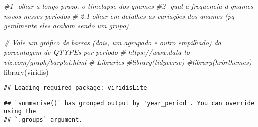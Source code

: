 \documentclass[
]{article}
\newenvironment{Shaded}{\begin{snugshade}}{\end{snugshade}}
\newcommand{\AttributeTok}[1]{\textcolor[rgb]{0.77,0.63,0.00}{#1}}
\newcommand{\CommentTok}[1]{\textcolor[rgb]{0.56,0.35,0.01}{\textit{#1}}}
\newcommand{\DecValTok}[1]{\textcolor[rgb]{0.00,0.00,0.81}{#1}}
\newcommand{\FunctionTok}[1]{\textcolor[rgb]{0.00,0.00,0.00}{#1}}
\newcommand{\NormalTok}[1]{#1}
\newcommand{\OtherTok}[1]{\textcolor[rgb]{0.56,0.35,0.01}{#1}}
\newcommand{\SpecialCharTok}[1]{\textcolor[rgb]{0.00,0.00,0.00}{#1}}
\begin{document}
\begin{Shaded}
\begin{Highlighting}[]
\CommentTok{\#1{-} olhar a longo prazo, o timelapse dos qnames}
\CommentTok{\#2{-} qual a frequencia d qnames novos nesses períodos}
 \CommentTok{\#   2.1 olhar em detalhes as variações dos qnames (pq geralmente eles acabam sendo um grupo)}
\end{Highlighting}
\end{Shaded}

\begin{Shaded}
\begin{Highlighting}[]
\CommentTok{\# Vale um gráfico de barras (dois, um agrupado e outro empilhado) da porcentagem de QTYPEs por período}
\CommentTok{\# https://www.data{-}to{-}viz.com/graph/barplot.html}
\CommentTok{\# Libraries}
\CommentTok{\#library(tidyverse)}
\CommentTok{\#library(hrbrthemes)}
\FunctionTok{library}\NormalTok{(viridis)}
\end{Highlighting}
\end{Shaded}

\begin{verbatim}
## Loading required package: viridisLite
\end{verbatim}

\begin{Shaded}
\end{Shaded}

\begin{verbatim}
## `summarise()` has grouped output by 'year_period'. You can override using the
## `.groups` argument.
\end{verbatim}
\end{document}
